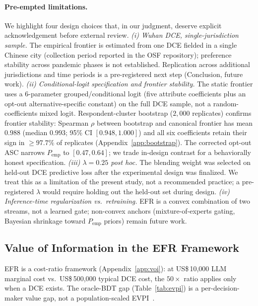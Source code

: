 \documentclass[11pt]{article}
\begin{document}
\paragraph*{Pre-empted limitations.} We highlight four design choices that, in our judgment, deserve explicit acknowledgement before external review. \emph{(i) Wuhan DCE, single-jurisdiction sample.} The empirical frontier is estimated from one DCE fielded in a single Chinese city (collection period reported in the OSF repository); preference stability across pandemic phases is not established. Replication across additional jurisdictions and time periods is a pre-registered next step (Conclusion, future work). \emph{(ii) Conditional-logit specification and frontier stability.} The static frontier uses a 6-parameter grouped/conditional logit (five attribute coefficients plus an opt-out alternative-specific constant) on the full DCE sample, not a random-coefficients mixed logit. Respondent-cluster bootstrap ($2{,}000$ replicates) confirms frontier stability: Spearman $\rho$ between bootstrap and canonical frontier has mean $0.988$ (median $0.993$; 95\% CI $[0.948, 1.000]$) and all six coefficients retain their sign in $\geq 97.7\%$ of replicates (Appendix~\ref{app:bootstrap}). The corrected opt-out ASC narrows $P_{\mathrm{emp}}$ to $[0.47, 0.64]$; we trade in-design contrast for a behaviorally honest specification. \emph{(iii) \(\lambda = 0.25\) post hoc.} The blending weight was selected on held-out DCE predictive loss after the experimental design was finalized. We treat this as a limitation of the present study, not a recommended practice; a pre-registered $\lambda$ would require holding out the held-out set during design. \emph{(iv) Inference-time regularization vs.\ retraining.} EFR is a convex combination of two streams, not a learned gate; non-convex anchors (mixture-of-experts gating, Bayesian shrinkage toward $P_{\mathrm{emp}}$ priors) remain future work.

\subsection{Value of Information in the EFR Framework}
\label{sec:voi}

EFR is a cost-ratio framework (Appendix~\ref{app:voi}): at US\$\,10,000 LLM marginal cost vs.\ US\$\,500,000 typical DCE cost, the $50\times$ ratio applies only when a DCE exists. The oracle-BDT gap (Table~\ref{tab:evpi}) is a per-decision-maker value gap, not a population-scaled EVPI~\citep{Fenwick2008EVPI}.
\end{document}
